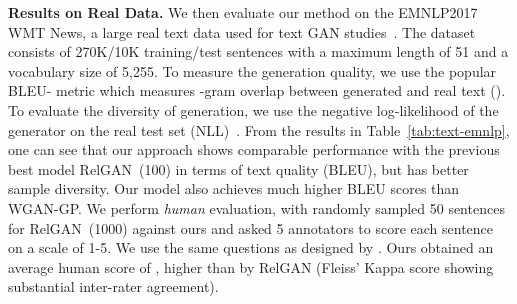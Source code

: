 \documentclass{article}
\newcommand{\0}{\bm{0}}
\begin{document}
\textbf{Results on Real Data.}
We then evaluate our method on the EMNLP2017 WMT News, a large real text data used for text GAN studies~\cite{guo2018long,nie2018relgan}. The dataset consists of 270K/10K training/test sentences with a maximum length of 51 and a vocabulary size of 5,255. To measure the generation quality, we use the popular BLEU- metric which measures -gram overlap between generated and real text (). To evaluate the diversity of generation, we use the negative log-likelihood of the generator on the real test set (NLL)~\cite{guo2018long,nie2018relgan}. From the results in Table~\ref{tab:text-emnlp}, one can see that our approach shows comparable performance with the previous best model RelGAN~(100) in terms of text quality (BLEU), but has better sample diversity.
Our model also achieves much higher BLEU scores than WGAN-GP. 
We perform \emph{human} evaluation, with randomly sampled 50 sentences for RelGAN~(1000) against ours and asked 5 annotators to score each sentence on a scale of 1-5. We use the same questions as designed by \citep{nie2018relgan}. Ours obtained an average human score of , higher than  by RelGAN (Fleiss' Kappa score  showing substantial inter-rater agreement). 
\end{document}

